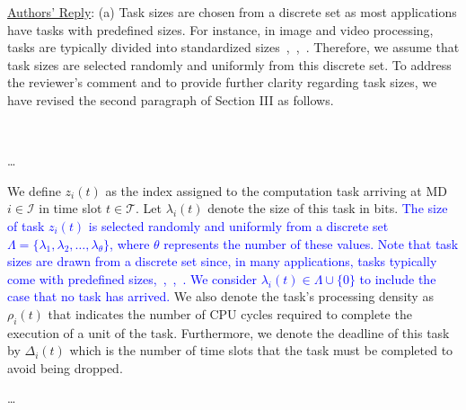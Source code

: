 \documentclass[12pt,draftclsnofoot,onecolumn]{IEEEtran}
\newcommand{\rev}[1]{{\color{blue}#1}} %
\newcommand{\rev}[1]{#1}
\newenvironment{my}[2]%
{\begin{list}{}%
{\setlength{\rightmargin}{#1}\setlength{\leftmargin}{#2}}%


 \item[]{}

} {\end{list}}
\begin{document}
\begin{enumerate}
\underline{Authors' Reply}: (a) Task sizes are chosen from a discrete set as most applications have tasks with predefined sizes. For instance, in image and video processing, tasks are typically divided into standardized sizes~\cite{wang2020intelligent},~\cite{zhang2019toward},~\cite{allahham2022multi}. Therefore, we assume that task sizes are selected randomly and uniformly from this discrete set. To address the reviewer’s comment and to provide further clarity regarding task sizes, we have revised the second paragraph of Section III as follows. \vspace{-3mm}
		\begin{my}{1cm}{1cm}
	\rev{
		{\
			
			 \dots

\color{black}
We define $z_i(t)$ as the index assigned to the computation task arriving at MD $i \in \mathcal{I}$ in time slot $t \in \mathcal{T}$. Let $\lambda_i(t)$ denote the size of this task in bits. \textcolor{blue}{The size of task \( z_i(t) \) is selected randomly and uniformly from a discrete set \( \Lambda = \{\lambda_1, \lambda_2, \ldots, \lambda_{\theta}\} \), where \( \theta \) represents the number of these values. Note that task sizes are drawn from a discrete set since, in many applications, tasks typically come with predefined sizes,~\cite{wang2020intelligent},~\cite{zhang2019toward},~\cite{allahham2022multi}. We consider $\lambda_i(t) \in \Lambda \cup \{0\}$ to include the case that no task has arrived.} We also denote the task's processing density as $\rho_i(t)$ that indicates the number of CPU cycles required to complete the execution of a unit of the task. Furthermore, we denote the deadline of this task by $\Delta_i(t)$ which is the number of time slots that the task must be completed to avoid being dropped.

\dots




}}
\end{my} \vspace{3mm}

\setcounter{equation}{13}


\end{enumerate}
\end{document}
